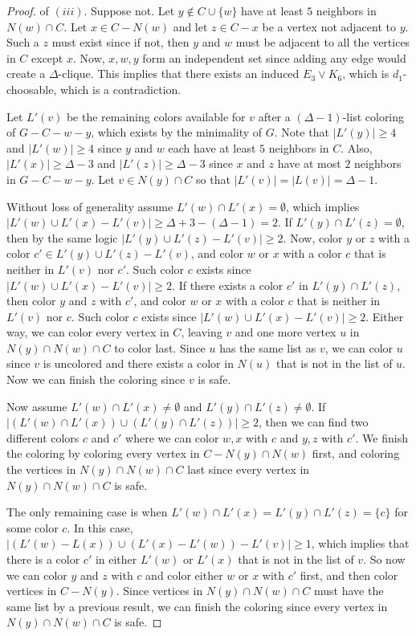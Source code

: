 \documentclass[12pt]{article}
\theoremstyle{definition}
\begin{document}
\begin{proof} of $(iii)$.
Suppose not. 
Let $y\not\in C\cup\{w\}$ have at least $5$ neighbors in $N(w)\cap C$. 
Let $x\in C-N(w)$ and let $z\in C-x$ be a vertex not adjacent to $y$. 
Such a $z$ must exist since if not, then $y$ and $w$ must be adjacent to all the vertices in $C$ except $x$. 
Now, $x, w, y$ form an independent set since adding any edge would create a $\Delta$-clique. 
This implies that there exists an induced $E_3\vee K_6$, which is $d_1$-choosable, which is a contradiction. 

Let $L'(v)$ be the remaining colors available for $v$ after a $(\Delta-1)$-list coloring of $G-C-w-y$, which exists by the minimality of $G$. 
Note that $|L'(y)|\geq 4$ and $|L'(w)|\geq 4$ since $y$ and $w$ each have at least $5$ neighbors in $C$.
Also, $|L'(x)|\geq \Delta-3$ and $|L'(z)|\geq \Delta-3$ since $x$ and $z$ have at most $2$ neighbors in $G-C-w-y$. Let $v\in N(y)\cap C$ so that $|L'(v)|=|L(v)|=\Delta-1$.

Without loss of generality assume $L'(w)\cap L'(x)=\emptyset$, which implies $|L'(w)\cup L'(x)-L'(v)|\geq \Delta+3-(\Delta-1)=2$. 
If $L'(y)\cap L'(z)=\emptyset$, then by the same logic $|L'(y)\cup L'(z)-L'(v)|\geq 2$. 
Now, color $y$ or $z$ with a color $c'\in L'(y)\cup L'(z)-L'(v)$, and color $w$ or $x$ with a color $c$ that is neither in $L'(v)$ nor $c'$.
Such color $c$ exists since $|L'(w)\cup L'(x)-L'(v)|\geq 2$. 
If there exists a color $c'$ in $L'(y)\cap L'(z)$, then color $y$ and $z$ with $c'$, and color $w$ or $x$ with a color $c$ that is neither in $L'(v)$ nor $c$. 
Such color $c$ exists since $|L'(w)\cup L'(x)-L'(v)|\geq 2$.
Either way, we can color every vertex in $C$, leaving $v$ and one more vertex $u$ in $N(y)\cap N(w)\cap C$ to color last.
Since $u$ has the same list as $v$, we can color $u$ since $v$ is uncolored and there exists a color in $N(u)$ that is not in the list of $u$. Now we can finish the coloring since $v$ is safe. 

Now assume $L'(w)\cap L'(x)\neq \emptyset$ and $L'(y)\cap L'(z)\neq \emptyset$. 
If $|(L'(w)\cap L'(x))\cup (L'(y)\cap L'(z))|\geq 2$, then we can find two different colors $c$ and $c'$ where we can color $w, x$ with $c$ and $y, z$ with $c'$. 
We finish the coloring by coloring every vertex in $C-N(y)\cap N(w)$ first, and coloring the vertices in $N(y)\cap N(w)\cap C$ last since every vertex in $N(y)\cap N(w)\cap C$ is safe. 

The only remaining case is when $L'(w)\cap L'(x)=L'(y)\cap L'(z)=\{c\}$ for some color $c$.
In this case, $|(L'(w)-L(x))\cup (L'(x)-L'(w))-L'(v)|\geq 1$, which implies that there is a color $c'$ in either $L'(w)$ or $L'(x)$ that is not in the list of $v$. 
So now we can color $y$ and $z$ with $c$ and color either $w$ or $x$ with $c'$ first, and then color vertices in $C-N(y)$. Since vertices in $N(y)\cap N(w)\cap C$ must have the same list by a previous result, we can finish the coloring since every vertex in $N(y)\cap N(w)\cap C$ is safe. 
\end{proof}
\end{document}
